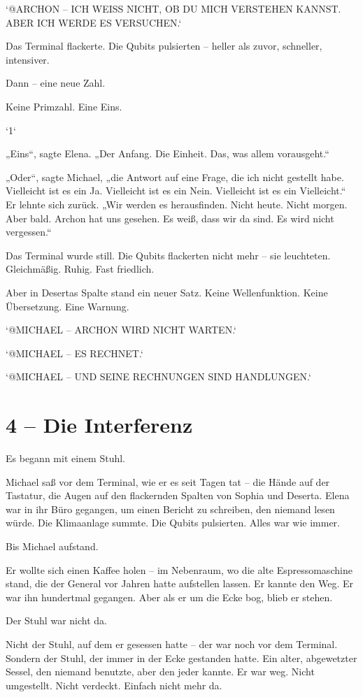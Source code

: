 \documentclass[
]{article}
\begin{document}
`@ARCHON -- ICH WEISS NICHT, OB DU MICH VERSTEHEN KANNST. ABER ICH WERDE ES VERSUCHEN.`

Das Terminal flackerte. Die Qubits pulsierten -- heller als zuvor, schneller, intensiver.

Dann -- eine neue Zahl.

Keine Primzahl. Eine Eins.

`1`

„Eins``, sagte Elena. „Der Anfang. Die Einheit. Das, was allem vorausgeht.``

„Oder``, sagte Michael, „die Antwort auf eine Frage, die ich nicht gestellt habe. Vielleicht ist es ein Ja. Vielleicht ist es ein Nein. Vielleicht ist es ein Vielleicht.`` Er lehnte sich zurück. „Wir werden es herausfinden. Nicht heute. Nicht morgen. Aber bald. Archon hat uns gesehen. Es weiß, dass wir da sind. Es wird nicht vergessen.``

Das Terminal wurde still. Die Qubits flackerten nicht mehr -- sie leuchteten. Gleichmäßig. Ruhig. Fast friedlich.

Aber in Desertas Spalte stand ein neuer Satz. Keine Wellenfunktion. Keine Übersetzung. Eine Warnung.

`@MICHAEL -- ARCHON WIRD NICHT WARTEN.`

`@MICHAEL -- ES RECHNET.`

`@MICHAEL -- UND SEINE RECHNUNGEN SIND HANDLUNGEN.`

\section{4 -- Die Interferenz}\label{die-interferenz}

Es begann mit einem Stuhl.

Michael saß vor dem Terminal, wie er es seit Tagen tat -- die Hände auf der Tastatur, die Augen auf den flackernden Spalten von Sophia und Deserta. Elena war in ihr Büro gegangen, um einen Bericht zu schreiben, den niemand lesen würde. Die Klimaanlage summte. Die Qubits pulsierten. Alles war wie immer.

Bis Michael aufstand.

Er wollte sich einen Kaffee holen -- im Nebenraum, wo die alte Espressomaschine stand, die der General vor Jahren hatte aufstellen lassen. Er kannte den Weg. Er war ihn hundertmal gegangen. Aber als er um die Ecke bog, blieb er stehen.

Der Stuhl war nicht da.

Nicht der Stuhl, auf dem er gesessen hatte -- der war noch vor dem Terminal. Sondern der Stuhl, der immer in der Ecke gestanden hatte. Ein alter, abgewetzter Sessel, den niemand benutzte, aber den jeder kannte. Er war weg. Nicht umgestellt. Nicht verdeckt. Einfach nicht mehr da.
\end{document}
